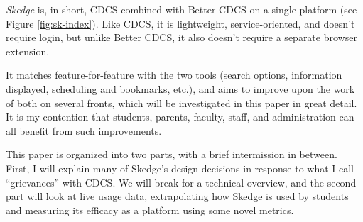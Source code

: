 \emph{Skedge} \cite{skedge} is, in short, CDCS combined with Better CDCS on a single platform (see Figure \ref{fig:sk-index}). Like CDCS, it is lightweight, service-oriented, and doesn't require login, but unlike Better CDCS, it also doesn't require a separate browser extension.

It matches feature-for-feature with the two tools (search options, information displayed, scheduling and bookmarks, etc.), and aims to improve upon the work of both on several fronts, which will be investigated in this paper in great detail. It is my contention that students, parents, faculty, staff, and administration can all benefit from such improvements.

\vspace{30pt}

\noindent
This paper is organized into two parts, with a brief intermission in between. First, I will explain many of Skedge's design decisions in response to what I call ``grievances'' with CDCS. We will break for a technical overview, and the second part will look at live usage data, extrapolating how Skedge is used by students and measuring its efficacy as a platform using some novel metrics.